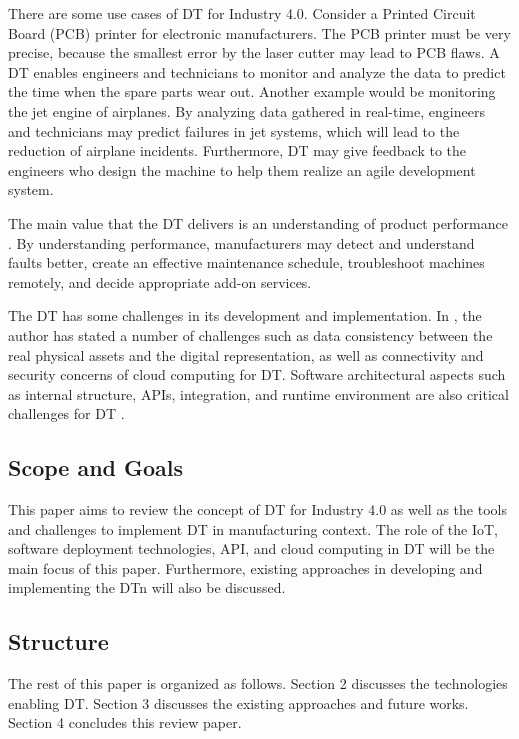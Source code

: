 \documentclass[article]{aaltoseries}
\begin{document}
There are some use cases of DT for Industry 4.0. Consider a Printed Circuit Board (PCB) printer for electronic manufacturers. The PCB printer must be very precise, because the smallest error by the laser cutter may lead to PCB flaws. A DT enables engineers and technicians to monitor and analyze the data to predict the time when the spare parts wear out. Another example would be monitoring the jet engine of airplanes. By analyzing data gathered in real-time, engineers and technicians may predict failures in jet systems, which will lead to the reduction of airplane incidents. Furthermore, DT may give feedback to the engineers who design the machine to help them realize an agile development system.

The main value that the DT delivers is an understanding of product performance \cite{Cheatshe3:online}. By understanding performance, manufacturers may detect and understand faults better, create an effective maintenance schedule, troubleshoot machines remotely, and decide appropriate add-on services.

The DT has some challenges in its development and implementation. In \cite{bienhaus2017patterns}, the author has stated a number of challenges such as data consistency between the real physical assets and the digital representation, as well as connectivity and security concerns of cloud computing for DT. Software architectural aspects such as internal structure, APIs, integration, and runtime environment are also critical challenges for DT \cite{malakuti2018architectural}.

\subsection{Scope and Goals}
\label{sec:emphasis}
This paper aims to review the concept of DT for Industry 4.0 as well as the tools and challenges to implement DT in manufacturing context. The role of the IoT, software deployment technologies, API, and cloud computing in DT will be the main focus of this paper. Furthermore, existing approaches in developing and implementing the DTn will also be discussed.

\subsection{Structure}
\label{sec:em}
The rest of this paper is organized as follows. Section 2 discusses the technologies enabling DT. Section 3 discusses the existing approaches and future works. Section 4 concludes this review paper.
 
\end{document}
